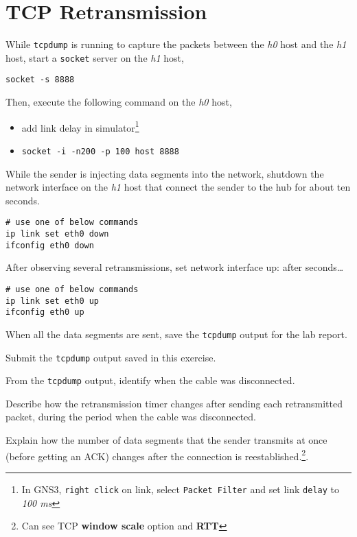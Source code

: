\documentclass{../UTNetLab}
\begin{document}
\section{TCP Retransmission}
    While \lstinline{tcpdump} is running to capture the packets between the \textit{h0} host and the \textit{h1} host, start a \lstinline{socket} server on the \textit{h1} host,
    \begin{lstlisting}
socket -s 8888
    \end{lstlisting}
    Then, execute the following command on the \textit{h0} host,
    \begin{itemize}
        \item add link delay in simulator\footnote{In GNS3, \lstinline{right click} on link, select \lstinline{Packet Filter} and set link \lstinline{delay} to \textit{100 ms}}
        \item \lstinline[emph={host}]{socket -i -n200 -p 100 host 8888}
    \end{itemize}
    While the sender is injecting data segments into the network, shutdown the network interface on the \textit{h1} host that connect the sender to the hub for about ten seconds.
    \begin{lstlisting}[emph={eth0}]
# use one of below commands
ip link set eth0 down
ifconfig eth0 down
    \end{lstlisting}

    After observing several retransmissions, set network interface up:
after seconds\ldots
    \begin{lstlisting}[emph={eth0}]
# use one of below commands
ip link set eth0 up
ifconfig eth0 up
    \end{lstlisting} %
    When all the data segments are sent, save the \lstinline{tcpdump} output for the lab report.
    
    \begin{report}
        \item Submit the \lstinline{tcpdump} output saved in this exercise.
        
        \item From the \lstinline{tcpdump} output, identify when the cable was disconnected.
        
        \item Describe how the retransmission timer changes after sending each retransmitted packet, during the period when the cable was disconnected.
        
        \item Explain how the number of data segments that the sender transmits at once (before getting an ACK) changes after the connection is reestablished.\footnote{Can see TCP \textbf{window scale} option and \textbf{RTT}}.
    \end{report}
    
\end{document}
